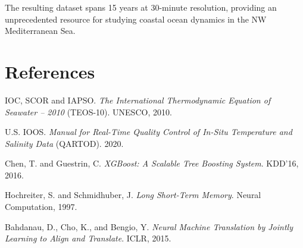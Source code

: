 \documentclass[12pt,a4paper]{article}
\begin{document}
The resulting dataset spans 15 years at 30-minute resolution, providing an unprecedented resource for studying coastal ocean dynamics in the NW Mediterranean Sea.

\section*{References}

\begin{enumerate}[label={[\arabic*]}]
    \item IOC, SCOR and IAPSO. \textit{The International Thermodynamic Equation of Seawater – 2010} (TEOS-10). UNESCO, 2010.
    \item U.S. IOOS. \textit{Manual for Real-Time Quality Control of In-Situ Temperature and Salinity Data} (QARTOD). 2020.
    \item Chen, T. and Guestrin, C. \textit{XGBoost: A Scalable Tree Boosting System}. KDD'16, 2016.
    \item Hochreiter, S. and Schmidhuber, J. \textit{Long Short-Term Memory}. Neural Computation, 1997.
    \item Bahdanau, D., Cho, K., and Bengio, Y. \textit{Neural Machine Translation by Jointly Learning to Align and Translate}. ICLR, 2015.
\end{enumerate}
\end{document}
